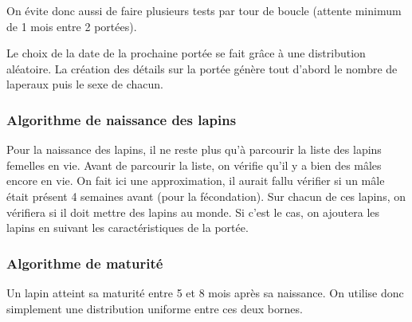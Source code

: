 \documentclass[11)pt,a4paper]{article}
\begin{document}
            On évite donc aussi de faire plusieurs tests par tour de boucle (attente minimum de 1 mois entre 2 portées).
            \begin{center}
                \begin{algorithm}
                \end{algorithm}
            \end{center}
            Le choix de la date de la prochaine portée se fait grâce à une distribution aléatoire. La création des détails sur la portée génère tout d'abord le nombre de laperaux puis le sexe de chacun.
            \begin{mdframed}[backgroundcolor=light-gray, roundcorner=20pt, innerleftmargin=20, innertopmargin=1, innerbottommargin=1, outerlinewidth=1, linecolor=darkgray]
                
            \end{mdframed}
        \subsubsection{Algorithme de naissance des lapins}
            Pour la naissance des lapins, il ne reste plus qu'à parcourir la liste des lapins femelles en vie. Avant de parcourir la liste, on vérifie qu'il y a bien des mâles encore en vie. On fait ici une approximation, il aurait fallu vérifier si un mâle était présent 4 semaines avant (pour la fécondation).
            Sur chacun de ces lapins, on vérifiera si il doit mettre des lapins au monde. Si c'est le cas, on ajoutera les lapins en suivant les caractéristiques de la portée.
            \begin{mdframed}[backgroundcolor=light-gray, roundcorner=20pt, innerleftmargin=20, innertopmargin=1, innerbottommargin=1, outerlinewidth=1, linecolor=darkgray]
                
            \end{mdframed}
        \subsubsection{Algorithme de maturité}
            Un lapin atteint sa maturité entre 5 et 8 mois après sa naissance. On utilise donc simplement une distribution uniforme entre ces deux bornes.
\end{document}
